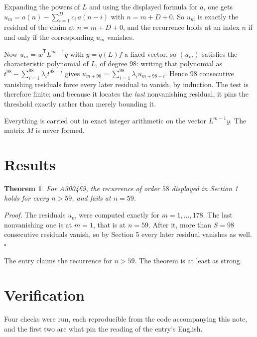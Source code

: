 \documentclass[11pt]{article}
\newtheorem{theorem}{Theorem}
\theoremstyle{definition}
\begin{document}
Expanding the powers of $L$ and using the displayed formula for $a$, one gets $u_m = a(n) - \sum_{i=1}^{D} c_i\,a(n-i)$ with $n = m + D + 0$. So $u_m$ is exactly the residual of the claim at $n = m + D + 0$, and the recurrence holds at an index $n$ if and only if the corresponding $u_m$ vanishes.

Now $u_m = \tilde w^{\mathsf T} L^{m-1} y$ with $y = q(L)\tilde f$ a fixed vector, so $(u_m)$ satisfies the characteristic polynomial of $L$, of degree $98$: writing that polynomial as $t^{98} - \sum_{i=1}^{98} \lambda_i t^{98-i}$ gives $u_{m+98} = \sum_{i=1}^{98} \lambda_i u_{m+98-i}$. Hence $98$ consecutive vanishing residuals force every later residual to vanish, by induction. The test is therefore finite; and because it locates the {\itshape last} nonvanishing residual, it pins the threshold exactly rather than merely bounding it.

Everything is carried out in exact integer arithmetic on the vector $L^{m-1}y$. The matrix $M$ is never formed.

\section{Results}

\begin{theorem} For A300469, the recurrence of order $58$ displayed in Section 1 holds for every $n > 59$, and fails at $n = 59$.\end{theorem}

{\itshape Proof.} The residuals $u_m$ were computed exactly for $m = 1,\dots,178$. The last nonvanishing one is at $m = 1$, that is at $n = 59$. After it, more than $S = 98$ consecutive residuals vanish, so by Section 5 every later residual vanishes as well. $\square$

The entry claims the recurrence for $n > 59$. The theorem is at least as strong.

\section{Verification}

Four checks were run, each reproducible from the code accompanying this note, and the first two are what pin the reading of the entry's English.
\end{document}
